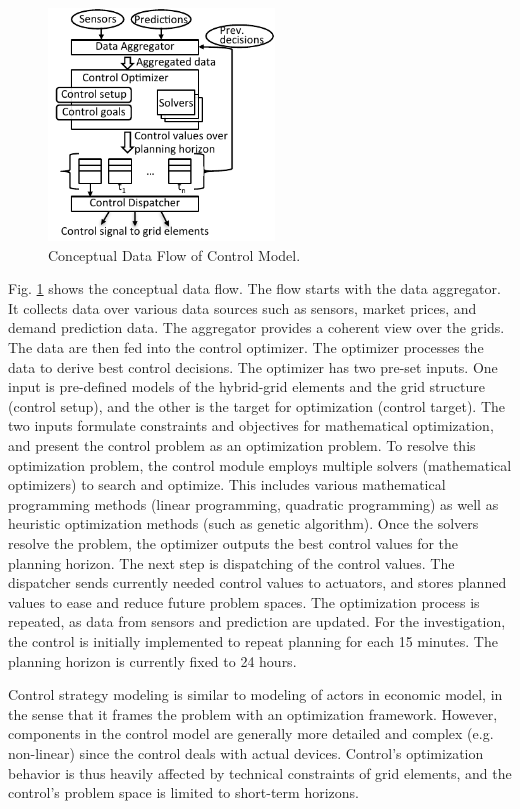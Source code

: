 \documentclass[review]{elsarticle}
\begin{document}
\begin{figure}[t]
  \centering
  \includegraphics[width=60mm]{figures/control_flow.pdf}
  \caption{Conceptual Data Flow of Control Model.}
  \label{fig:control}
\end{figure}
Fig. \ref{fig:control} shows the conceptual data flow. 
The flow starts with the data  aggregator. It collects data
over various data sources such as sensors, market prices, and demand 
prediction data. 
The aggregator provides a coherent view over the  grids.  
The data are then fed into the control optimizer. The optimizer
processes the data to derive best control decisions. 
The optimizer has two pre-set inputs. One input is pre-defined models
of the hybrid-grid elements and the grid structure (control setup),
and the other is the target for optimization (control target). 
The two inputs formulate constraints and objectives for mathematical
optimization, and present the control problem as an optimization
problem. 
To resolve this optimization problem, the control module employs
multiple solvers (mathematical optimizers) to search and optimize.
This includes various mathematical  programming methods (linear
programming, quadratic programming) as well as heuristic optimization
methods (such as genetic algorithm). 
Once the solvers resolve the problem, the optimizer outputs the
best control values for the planning horizon. 
The next step is dispatching of the control values. The dispatcher
sends currently needed control values to actuators, and stores
planned values to ease and reduce future problem spaces. The
optimization process is repeated, as data from sensors and prediction
are updated. For the investigation, the control is initially
implemented to repeat planning for each 15 minutes. The planning
horizon is currently fixed to 24 hours. 

Control strategy modeling is similar to modeling of actors in 
economic model, in the sense that it frames the problem with
an optimization framework. However, components in the control model
are generally more detailed and complex (e.g. non-linear) since the 
control deals with actual devices. Control's optimization behavior is 
thus heavily affected by technical constraints of grid
elements, and the control's problem space is limited to short-term
horizons. %
\end{document}
